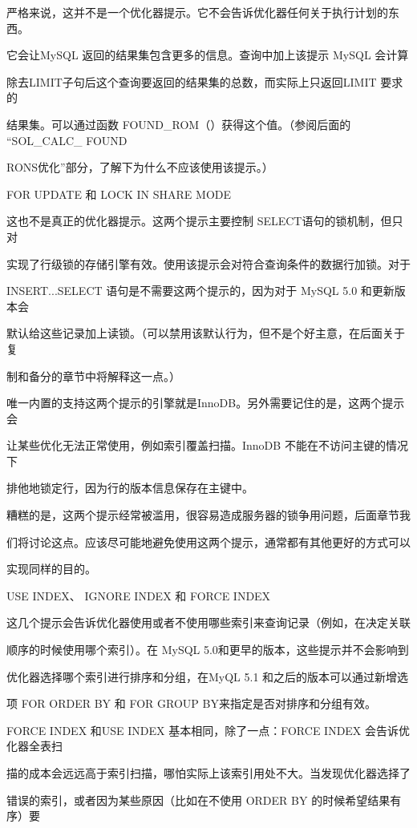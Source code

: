 严格来说，这并不是一个优化器提示。它不会告诉优化器任何关于执行计划的东西。

它会让MySQL 返回的结果集包含更多的信息。查询中加上该提示 MySQL 会计算

除去LIMIT子句后这个查询要返回的结果集的总数，而实际上只返回LIMIT 要求的

结果集。可以通过函数 FOUND\_ROM（）获得这个值。（参阅后面的 “SOL\_CALC\_ FOUND

RONS优化”部分，了解下为什么不应该使用该提示。）

FOR UPDATE 和 LOCK IN SHARE MODE

这也不是真正的优化器提示。这两个提示主要控制 SELECT语句的锁机制，但只对

实现了行级锁的存储引擎有效。使用该提示会对符合查询条件的数据行加锁。对于

INSERT...SELECT 语句是不需要这两个提示的，因为对于 MySQL 5.0 和更新版本会

默认给这些记录加上读锁。（可以禁用该默认行为，但不是个好主意，在后面关于复

制和备分的章节中将解释这一点。）

唯一内置的支持这两个提示的引擎就是InnoDB。另外需要记住的是，这两个提示会

让某些优化无法正常使用，例如索引覆盖扫描。InnoDB 不能在不访问主键的情况下

排他地锁定行，因为行的版本信息保存在主键中。

糟糕的是，这两个提示经常被滥用，很容易造成服务器的锁争用问题，后面章节我

们将讨论这点。应该尽可能地避免使用这两个提示，通常都有其他更好的方式可以

实现同样的目的。

USE INDEX、 IGNORE INDEX 和 FORCE INDEX

这几个提示会告诉优化器使用或者不使用哪些索引来查询记录（例如，在决定关联

顺序的时候使用哪个索引）。在 MySQL 5.0和更早的版本，这些提示并不会影响到

优化器选择哪个索引进行排序和分组，在MyQL 5.1 和之后的版本可以通过新增选

项 FOR ORDER BY 和 FOR GROUP BY来指定是否对排序和分组有效。

FORCE INDEX 和USE INDEX 基本相同，除了一点：FORCE INDEX 会告诉优化器全表扫

描的成本会远远高于索引扫描，哪怕实际上该索引用处不大。当发现优化器选择了

错误的索引，或者因为某些原因（比如在不使用 ORDER BY 的时候希望结果有序）要

